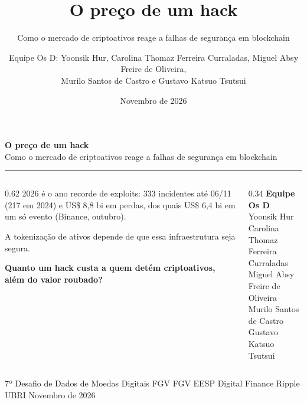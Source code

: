 \documentclass[aspectratio=169,10pt]{beamer}
\title{O preço de um hack}
\subtitle{Como o mercado de criptoativos reage a falhas de segurança em blockchain}
\author{Equipe Os D: Yoonsik Hur, Carolina Thomaz Ferreira Curraladas, Miguel Absy Freire de Oliveira,\\ Murilo Santos de Castro e Gustavo Katsuo Tsutsui}
\institute{7º Desafio de Dados de Moedas Digitais FGV \textbullet{} FGV EESP Digital Finance \textbullet{} Ripple UBRI}
\date{Novembro de 2026}
\begin{document}
\begin{frame}[plain]
\vspace{0.6cm}
{\LARGE\bfseries O preço de um hack}\\[4pt]
{\large Como o mercado de criptoativos reage a falhas de segurança em blockchain}\\[2pt]
{\color{amarelo}\rule{\textwidth}{2pt}}

\vspace{0.4cm}
\begin{columns}[T]
\begin{column}{0.62\textwidth}
\normalsize
\alert{2026 é o ano recorde de exploits}: 333 incidentes até 06/11 (217 em 2024) e US\$ 8{,}8 bi em perdas, dos quais US\$ 6,4 bi em um só evento (Binance, outubro).

\medskip
A tokenização de ativos depende de que essa infraestrutura seja segura.

\medskip
\textbf{Quanto um hack custa a quem detém criptoativos, além do valor roubado?}
\end{column}
\begin{column}{0.34\textwidth}
\small\color{cinza}
\textbf{Equipe Os D}\\
Yoonsik Hur\\
Carolina Thomaz Ferreira Curraladas\\
Miguel Absy Freire de Oliveira\\
Murilo Santos de Castro\\
Gustavo Katsuo Tsutsui
\end{column}
\end{columns}

\vfill
{\scriptsize\color{cinza}7º Desafio de Dados de Moedas Digitais FGV \textbullet{} FGV EESP Digital Finance \textbullet{} Ripple UBRI \textbullet{} Novembro de 2026}
\end{frame}
\end{document}
